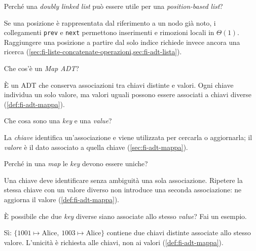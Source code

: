 \begin{exercise}
\label{ex:fi-esercizi-strutture-dati-list-doubly-positional}
Perché una \emph{doubly linked list} può essere utile per una
\emph{position-based list}?
\end{exercise}

Se una posizione è rappresentata dal riferimento a un nodo già noto, i
collegamenti \texttt{prev} e \texttt{next} permettono inserimenti e rimozioni
locali in \(\Theta(1)\). Raggiungere una posizione a partire dal solo indice
richiede invece ancora una ricerca
(\cref{sec:fi-liste-concatenate-operazioni,sec:fi-adt-lista}).

\begin{exercise}
\label{ex:fi-esercizi-strutture-dati-map-definizione}
Che cos'è un \emph{Map ADT}?
\end{exercise}

È un ADT che conserva associazioni tra chiavi distinte e valori. Ogni chiave
individua un solo valore, ma valori uguali possono essere associati a chiavi
diverse (\cref{def:fi-adt-mappa}).

\begin{exercise}
\label{ex:fi-esercizi-strutture-dati-map-key-value}
Che cosa sono una \emph{key} e una \emph{value}?
\end{exercise}

La \emph{chiave} identifica un'associazione e viene utilizzata per cercarla o
aggiornarla; il \emph{valore} è il dato associato a quella chiave
(\cref{sec:fi-adt-mappa}).

\begin{exercise}
\label{ex:fi-esercizi-strutture-dati-map-chiavi-uniche}
Perché in una \emph{map} le \emph{key} devono essere uniche?
\end{exercise}

Una chiave deve identificare senza ambiguità una sola associazione. Ripetere la
stessa chiave con un valore diverso non introduce una seconda associazione: ne
aggiorna il valore (\cref{def:fi-adt-mappa}).

\begin{exercise}
\label{ex:fi-esercizi-strutture-dati-map-valori-ripetuti}
È possibile che due \emph{key} diverse siano associate allo stesso \emph{value}?
Fai un esempio.
\end{exercise}

Sì: \(\{1001\mapsto\text{Alice},\ 1003\mapsto\text{Alice}\}\) contiene due
chiavi distinte associate allo stesso valore. L'unicità è richiesta alle chiavi,
non ai valori (\cref{def:fi-adt-mappa}).

